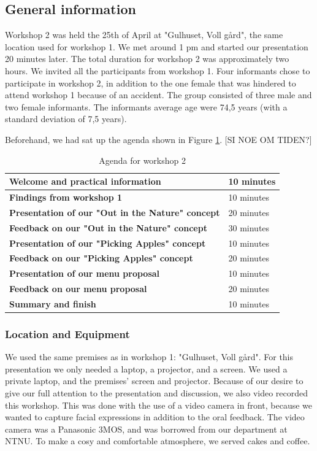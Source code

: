 \subsection{General information}
Workshop 2 was held the 25th of April at "Gulhuset, Voll gård", the same location used for workshop 1. We met around 1 pm and started our presentation 20 minutes later. The total duration for workshop 2 was approximately two hours. We invited all the participants from workshop 1. Four informants chose to participate in workshop 2, in addition to the one female that was hindered to attend workshop 1 because of an accident. The group consisted of three male and two female informants. The informants average age were 74,5 years (with a standard deviation of 7,5 years).  

Beforehand, we had sat up the agenda shown in Figure \ref{tab:agendaW2}. [SI NOE OM TIDEN?]

\begin{table} [ht!]
\centering
    \begin{tabular}{|l|l|}
       \hline
       \textbf{Welcome and practical information} & 10 minutes  \\ \hline
       \textbf{Findings from workshop 1} & 10 minutes \\ \hline
       \textbf{Presentation of our "Out in the Nature" concept} & 20 minutes \\ \hline
	   \textbf{Feedback on our "Out in the Nature" concept} & 30 minutes \\ \hline
	   \textbf{Presentation of our "Picking Apples" concept} & 10 minutes \\ \hline
	   \textbf{Feedback on our "Picking Apples" concept} & 20 minutes \\ \hline
	   \textbf{Presentation of our menu proposal} & 10 minutes \\ \hline
	   \textbf{Feedback on our menu proposal} & 20 minutes \\ \hline
	   \textbf{Summary and finish} & 10 minutes \\ \hline
    \end{tabular}
    \caption[Workshop 2 agenda]{Agenda for workshop 2}
    \label{tab:agendaW2}
\end{table} 


\subsubsection{Location and Equipment}
We used the same premises as in workshop 1: "Gulhuset, Voll gård". 
For this presentation we only needed a laptop, a projector, and a screen. We used a private laptop, and the premises' screen and projector. Because of our desire to give our full attention to the presentation and discussion, we also video recorded this workshop. This was done with the use of a video camera in front, because we wanted to capture facial expressions in addition to the oral feedback. The video camera was a Panasonic 3MOS, and was borrowed from our department at NTNU. To make a cosy and comfortable atmosphere, we served cakes and coffee.   

